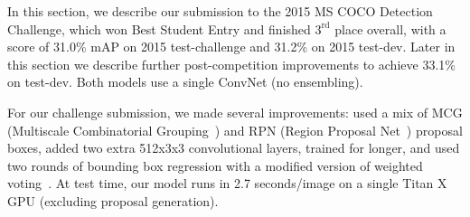 \documentclass[10pt,twocolumn,letterpaper]{article}
\begin{document}
In this section, we describe our submission to the 2015 MS COCO Detection
Challenge, which won Best Student Entry and finished $3^\text{rd}$ place
overall, with a score of 31.0\% mAP on 2015 test-challenge and 31.2\% on
2015 test-dev.  Later in this section we describe further post-competition
improvements to achieve 33.1\% on test-dev.  Both models use a single ConvNet
(no ensembling).

For our challenge submission, we made several improvements:
used a mix of MCG (Multiscale Combinatorial Grouping~\cite{MCG-PABMM2015}) and
RPN (Region Proposal Net~\cite{ren2015faster}) proposal boxes, added two extra
512x3x3 convolutional layers, trained for longer, and used two
rounds of bounding box regression with a modified version of weighted
voting~\cite{MR-CNN}.  At test time, our model runs in 2.7 seconds/image on a
single Titan X GPU (excluding proposal generation).
\end{document}
